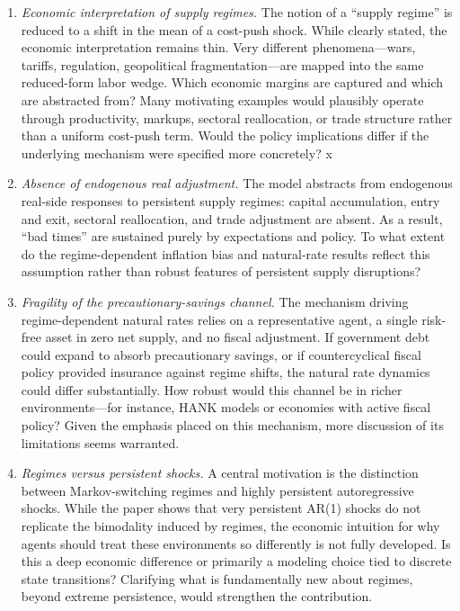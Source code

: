 \documentclass[12pt]{article}
\begin{document}
\begin{enumerate}

\item \textit{Economic interpretation of supply regimes.}
The notion of a ``supply regime'' is reduced to a shift in the mean of a cost-push shock. While clearly stated, the economic interpretation remains thin. Very different phenomena---wars, tariffs, regulation, geopolitical fragmentation---are mapped into the same reduced-form labor wedge. Which economic margins are captured and which are abstracted from? Many motivating examples would plausibly operate through productivity, markups, sectoral reallocation, or trade structure rather than a uniform cost-push term. Would the policy implications differ if the underlying mechanism were specified more concretely?
x
\item \textit{Absence of endogenous real adjustment.}
The model abstracts from endogenous real-side responses to persistent supply regimes: capital accumulation, entry and exit, sectoral reallocation, and trade adjustment are absent. As a result, ``bad times'' are sustained purely by expectations and policy. To what extent do the regime-dependent inflation bias and natural-rate results reflect this assumption rather than robust features of persistent supply disruptions?

\item \textit{Fragility of the precautionary-savings channel.}
The mechanism driving regime-dependent natural rates relies on a representative agent, a single risk-free asset in zero net supply, and no fiscal adjustment. If government debt could expand to absorb precautionary savings, or if countercyclical fiscal policy provided insurance against regime shifts, the natural rate dynamics could differ substantially. How robust would this channel be in richer environments---for instance, HANK models or economies with active fiscal policy? Given the emphasis placed on this mechanism, more discussion of its limitations seems warranted.

\item \textit{Regimes versus persistent shocks.}
A central motivation is the distinction between Markov-switching regimes and highly persistent autoregressive shocks. While the paper shows that very persistent AR(1) shocks do not replicate the bimodality induced by regimes, the economic intuition for why agents should treat these environments so differently is not fully developed. Is this a deep economic difference or primarily a modeling choice tied to discrete state transitions? Clarifying what is fundamentally new about regimes, beyond extreme persistence, would strengthen the contribution.


\end{enumerate}
\end{document}
